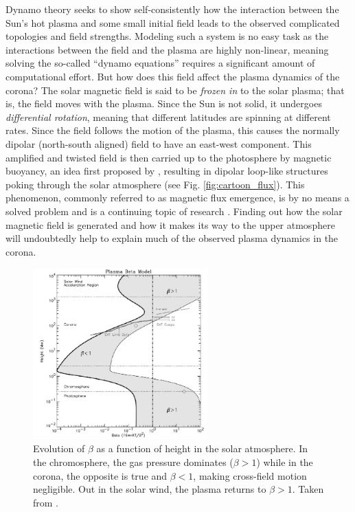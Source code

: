 %
\par Dynamo theory seeks to show self-consistently how the interaction between the Sun's hot plasma and some small initial field leads to the observed complicated topologies and field strengths. Modeling such a system is no easy task as the interactions between the field and the plasma are highly non-linear, meaning solving the so-called ``dynamo equations'' requires a significant amount of computational effort. But how does this field affect the plasma dynamics of the corona? The solar magnetic field is said to be \textit{frozen in} to the solar plasma; that is, the field moves with the plasma. Since the Sun is not solid, it undergoes \textit{differential rotation}, meaning that different latitudes are spinning at different rates. Since the field follows the motion of the plasma, this causes the normally dipolar (north-south aligned) field to have an east-west component. This amplified and twisted field is then carried up to the photosphere by magnetic buoyancy, an idea first proposed by \citep{parker_formation_1955}, resulting in dipolar loop-like structures poking through the solar atmosphere (see Fig. \ref{fig:cartoon_flux}). This phenomenon, commonly referred to as magnetic flux emergence, is by no means a solved problem and is a continuing topic of research \citep[see][]{cheung_flux_2014}. Finding out how the solar magnetic field is generated and how it makes its way to the upper atmosphere will undoubtedly help to explain much of the observed plasma dynamics in the corona. 
%
\begin{figure}[htbp]
	\centering
	\includegraphics[width=0.6\textwidth]{figures/plasma_beta.png}
	\caption{Evolution of $\beta$ as a function of height in the solar atmosphere. In the chromosphere, the gas pressure dominates ($\beta>1$) while in the corona, the opposite is true and $\beta<1$, making cross-field motion negligible. Out in the solar wind, the plasma returns to $\beta>1$. Taken from \citet{gary_plasma_2001}.}
	\label{fig:plasma_beta}
\end{figure}
%
